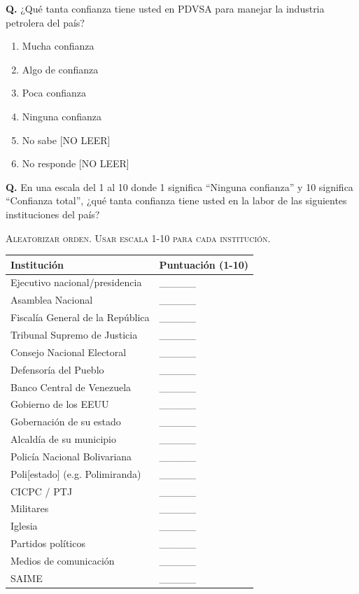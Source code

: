 \documentclass[11pt,letterpaper]{article}
\newcounter{question}
\newcommand{\question}[1]{%
  \stepcounter{question}%
  \vspace{0.3em}%
  \noindent\textbf{Q\thequestion.} #1%
}
\newcommand{\instruction}[1]{%
  \vspace{0.1em}%
  \noindent\textsc{\small #1}%
  \vspace{0.1em}%
}
\newenvironment{responses}
{\begin{enumerate}[label=(\arabic*), leftmargin=2em, itemsep=0em, parsep=0em, topsep=0em]}
{\end{enumerate}\vspace{0.3em}}
\begin{document}
\question{¿Qué tanta confianza tiene usted en PDVSA para manejar la industria petrolera del país?}
\begin{responses}
\item Mucha confianza
\item Algo de confianza
\item Poca confianza
\item Ninguna confianza
\item[(98)] No sabe [NO LEER]
\item[(99)] No responde [NO LEER]
\end{responses}

\question{En una escala del 1 al 10 donde 1 significa ``Ninguna confianza'' y 10 significa ``Confianza total'', ¿qué tanta confianza tiene usted en la labor de las siguientes instituciones del país?}

\instruction{Aleatorizar orden. Usar escala 1-10 para cada institución.}

\vspace{0.3em}
\begin{tabular}{p{5.5cm}p{8cm}}
\textbf{Institución} & \textbf{Puntuación (1-10)} \\
\midrule
Ejecutivo nacional/presidencia & \_\_\_\_\_ \\
Asamblea Nacional & \_\_\_\_\_ \\
Fiscalía General de la República & \_\_\_\_\_ \\
Tribunal Supremo de Justicia & \_\_\_\_\_ \\
Consejo Nacional Electoral & \_\_\_\_\_ \\
Defensoría del Pueblo & \_\_\_\_\_ \\
Banco Central de Venezuela & \_\_\_\_\_ \\
Gobierno de los EEUU & \_\_\_\_\_ \\
Gobernación de su estado & \_\_\_\_\_ \\
Alcaldía de su municipio & \_\_\_\_\_ \\
Policía Nacional Bolivariana & \_\_\_\_\_ \\
Poli[estado] (e.g. Polimiranda) & \_\_\_\_\_ \\
CICPC / PTJ & \_\_\_\_\_ \\
Militares & \_\_\_\_\_ \\
Iglesia & \_\_\_\_\_ \\
Partidos políticos & \_\_\_\_\_ \\
Medios de comunicación & \_\_\_\_\_ \\
SAIME & \_\_\_\_\_ \\
\end{tabular}
\end{document}
